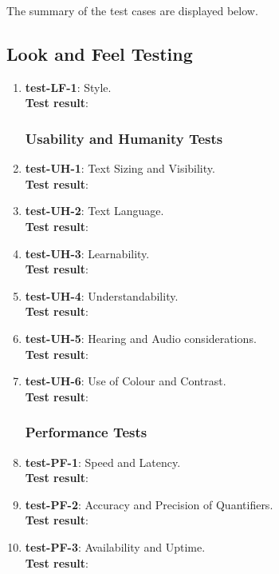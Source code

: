 \documentclass[12pt, titlepage]{article}
\begin{document}
\noindent The summary of the test cases are displayed below.

\subsection{Look and Feel Testing}
\begin{enumerate}
	\item{\textbf{test-LF-1}}: Style.\\
	\textbf{Test result}:
	
\subsubsection{Usability and Humanity Tests}
	\item{\textbf{test-UH-1}}: Text Sizing and Visibility.\\
	\textbf{Test result}:
	
	\item{\textbf{test-UH-2}}: Text Language.\\
	\textbf{Test result}:
	
	\item{\textbf{test-UH-3}}: Learnability.\\
	\textbf{Test result}:
	
	\item{\textbf{test-UH-4}}: Understandability.\\
	\textbf{Test result}:
	
	\item{\textbf{test-UH-5}}: Hearing and Audio considerations.\\
	\textbf{Test result}:
	
	\item{\textbf{test-UH-6}}: Use of Colour and Contrast.\\
	\textbf{Test result}:
	
\subsubsection{Performance Tests}
	\item{\textbf{test-PF-1}}: Speed and Latency.\\
	\textbf{Test result}:
	
	\item{\textbf{test-PF-2}}: Accuracy and Precision of Quantifiers.\\
	\textbf{Test result}:
	
	\item{\textbf{test-PF-3}}: Availability and Uptime.\\
	\textbf{Test result}:
	

\end{enumerate}
\end{document}
